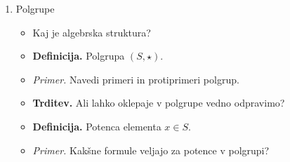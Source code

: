 \begin{enumerate}
    \item Polgrupe
    \begin{itemize}
        \item Kaj je algebrska struktura?
        \item \colorbox{purple!30}{\textbf{Definicija.}} Polgrupa $(S, \star )$.
        \item \colorbox{yellow!30}{\emph{Primer.}} Navedi primeri in protiprimeri polgrup.
        \item \colorbox{blue!30}{\textbf{Trditev.}} Ali lahko oklepaje v polgrupe vedno odpravimo?
        \item \colorbox{purple!30}{\textbf{Definicija.}} Potenca elementa $x \in S$.
        \item \colorbox{yellow!30}{\emph{Primer.}} Kakšne formule veljajo za potence v polgrupi?
    \end{itemize}


\end{enumerate}
